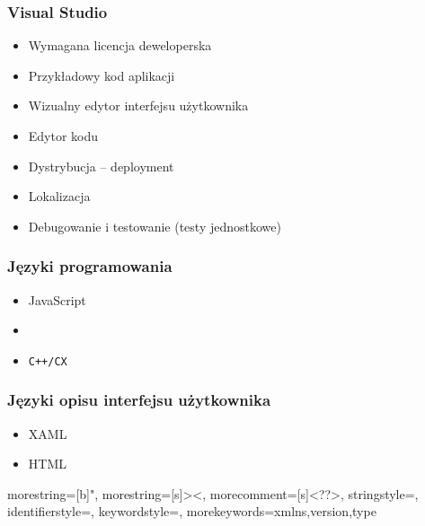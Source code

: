 \begin{frame}
\frametitle{Visual Studio}
\begin{itemize}
\item	Wymagana licencja deweloperska
\item	Przykładowy kod aplikacji
\item	Wizualny edytor interfejsu użytkownika
\item	Edytor kodu
\item	Dystrybucja -- deployment
\item	Lokalizacja
\item 	Debugowanie i testowanie (testy jednostkowe)
\end{itemize}
\end{frame}

\begin{frame}
\frametitle{Języki programowania}
\begin{itemize}
\item	JavaScript
\item	\Csharp
\item	\texttt{C++/CX}

\end{itemize}
\end{frame}

\begin{frame}
\frametitle{Języki opisu interfejsu użytkownika}
\begin{itemize}
\item	XAML
\item	HTML
\end{itemize}
\end{frame}


{
  morestring=[b]",
  morestring=[s]{>}{<},
  morecomment=[s]{<?}{?>},
  stringstyle=\color{black},
  identifierstyle=\color{darkblue},
  keywordstyle=\color{cyan},
  morekeywords={xmlns,version,type}%
}

